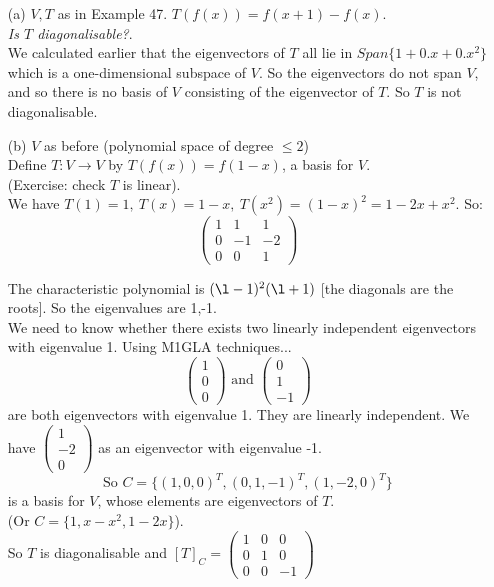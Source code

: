 \documentclass[twoside]{scrartcl}
\begin{document}
\begin{examples}\begin{itemize}
\item[(a)] $V,T$ as in Example 47. $T(f(x)) = f(x+1) - f(x)$.\\
 \emph{Is $T$ diagonalisable?}.\\
 
We calculated earlier that the eigenvectors of $T$ all lie in $Span\{1 + 0.x + 0.x^2\}$ which is a one-dimensional subspace of $V$. So the eigenvectors do not span $V$, and so there is no basis of $V$ consisting of the eigenvector of $T$. So $T$ is not diagonalisable. 

\item[(b)] $V$ as before (polynomial space of degree $\leq 2$)\\
Define $T: V\to V$ by $T(f(x)) = f(1-x)$, a basis for $V$.\\ (Exercise: check $T$ is linear).\\ We have $T(1) = 1,~ T(x) = 1-x,~ T(x^2) = (1-x)^2 = 1-2x + x^2.$ So:
\[
\begin{pmatrix}
1 & 1 & 1 \\ 0 & -1 & -2 \\ 0 & 0 & 1
\end{pmatrix}
\]

The characteristic polynomial is $(\l-1)^2(\l+1)$ [the diagonals are the roots]. So the eigenvalues are 1,-1. \\

We need to know whether there exists two linearly independent eigenvectors with eigenvalue 1. Using M1GLA techniques...
\[
\left(\begin{smallmatrix}
1 \\ 0 \\0
\end{smallmatrix} \right) \text{ and } \left(\begin{smallmatrix}
0 \\ 1 \\-1
\end{smallmatrix} \right)\]
are both eigenvectors with eigenvalue 1. They are linearly independent. We have $\left(\begin{smallmatrix}
1 \\ -2 \\0
\end{smallmatrix} \right)
$ as an eigenvector with eigenvalue -1.
\[\text{So } C = \{(1,0,0)^T,(0,1,-1)^T,(1,-2,0)^T\}\] is a basis for $V$, whose elements are eigenvectors of $T.$\\ (Or $C = \{1, x-x^2,1-2x\}$). \\

So $T$ is diagonalisable and $[T]_C = \begin{pmatrix}
 1 & 0 & 0 \\ 0 & 1 & 0 \\ 0 & 0 & -1
 \end{pmatrix}$
 
 \end{itemize}
 \end{examples}
 
\end{document}
